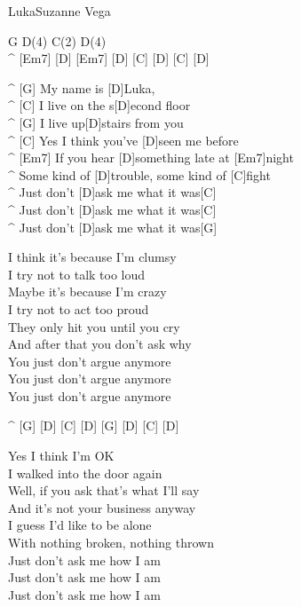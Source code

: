 \begin{song}{Luka}{Suzanne Vega}

\begin{guitar}
G  D(4) C(2) D(4)\\
^ [Em7] [D] [Em7] [D] [C] [D] [C] [D]\\

\end{guitar}
\begin{guitar}
^ [G] My name is [D]Luka, \\
^ [C] I live on the s[D]econd floor\\
^ [G] I live up[D]stairs from you\\
^ [C] Yes I think you've [D]seen me before\\
^ [Em7] If you hear [D]something late at [Em7]night\\
^ Some kind of [D]trouble, some kind of [C]fight\\
^ Just don't [D]ask me what it was[C]\\
^ Just don't [D]ask me what it was[C]\\
^ Just don't [D]ask me what it was[G]\\
\end{guitar}

\begin{guitar}
I think it's because I'm clumsy\\
I try not to talk too loud\\
Maybe it's because I'm crazy\\
I try not to act too proud\\
They only hit you until you cry\\
And after that you don't ask why\\
You just don't argue anymore\\
You just don't argue anymore\\
You just don't argue anymore\\
\end{guitar}

\begin{guitar}
^ [G] [D] [C] [D] [G] [D] [C] [D]\\

\end{guitar}
\begin{guitar}
Yes I think I'm OK\\
I walked into the door again\\
Well, if you ask that's what I'll say\\
And it's not your business anyway\\
I guess I'd like to be alone\\
With nothing broken, nothing thrown\\
Just don't ask me how I am\\
Just don't ask me how I am\\
Just don't ask me how I am\\
\end{guitar}


\end{song}

